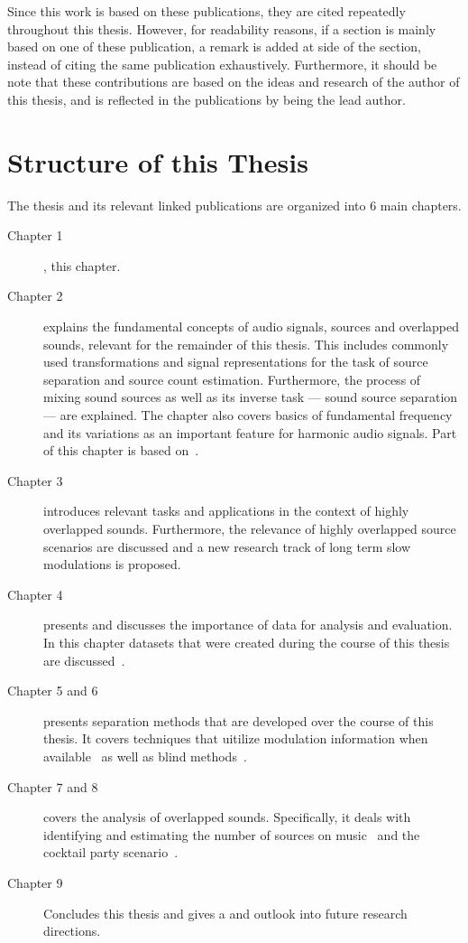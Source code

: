 Since this work is based on these publications, they are cited repeatedly throughout this thesis. However, for readability reasons, if a section is mainly based on one of these publication, a remark is added at side of the section, instead of citing the same publication exhaustively. Furthermore, it should be note that these contributions are based on the ideas and research of the author of this thesis, and is reflected in the publications by being the lead author.

\section{Structure of this Thesis}

The thesis and its relevant linked publications are organized into 6 main chapters.
\begin{description}
  \item[Chapter 1], this chapter.
  \item[Chapter 2] explains the fundamental concepts of audio signals, sources and overlapped sounds, relevant for the remainder of this thesis. This includes commonly used transformations and signal representations for the task of source separation and source count estimation.
  Furthermore, the process of mixing sound sources as well as its inverse task --- sound source separation --- are explained.
  The chapter also covers basics of fundamental frequency and its variations as an important feature for harmonic audio signals.
  Part of this chapter is based on~\cite{rafii18}.
  \item[Chapter 3] introduces relevant tasks and applications in the context of highly overlapped sounds.
  Furthermore, the relevance of highly overlapped source scenarios are discussed and a new research track of long term slow modulations is proposed.
  \item[Chapter 4] presents and discusses the importance of data for analysis and evaluation.
  In this chapter datasets that were created during the course of this thesis are discussed~\cite{oss_wice, oss_unison, oss_libricount, liutkus17}.
  \item[Chapter 5 and 6] presents separation methods that are developed over the course of this thesis. It covers techniques that uitilize modulation information when available~\cite{stoeter14, stoeter15acm, stoeter15icassp} as well as blind methods~\cite{stoeter16, liutkus17}.
  \item[Chapter 7 and 8] covers the analysis of overlapped sounds. Specifically, it deals with identifying and estimating the number of sources on music~\cite{schoeffler13, stoeter13} and the cocktail party scenario~\cite{stoeter19, stoeter18}.
  \item[Chapter 9] Concludes this thesis and gives a and outlook into future research directions.
\end{description}
